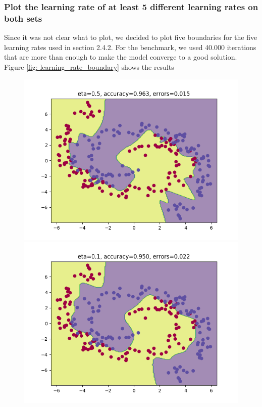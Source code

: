 \documentclass[11pt]{article}
\begin{document}
\subsubsection{Plot the learning rate of at least 5 different learning rates on both sets}
Since it was not clear what to plot, we decided to plot five boundaries for the five learning rates used in section 2.4.2. For the benchmark, we used 40.000 iterations that are more than enough to make the model converge to a good solution. Figure \ref{fig: learning_rate_boundary} shows the results
\begin{figure}[H]
	\includegraphics[scale=0.5]{images/NN_boundary_vs_learning_rates/0}
	\includegraphics[scale=0.5]{images/NN_boundary_vs_learning_rates/1}

\end{figure}
\end{document}
